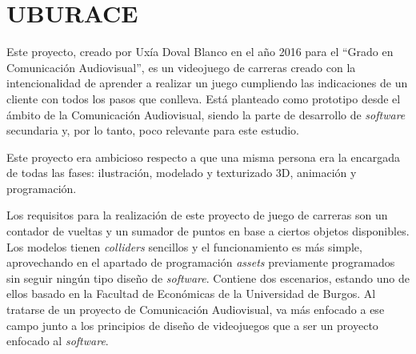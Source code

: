 \section{UBURACE}

Este proyecto, creado por Uxía Doval Blanco en el año 2016 para el ``Grado en Comunicación Audiovisual'', es un videojuego de carreras creado con la intencionalidad de aprender a realizar un juego cumpliendo las indicaciones de un cliente con todos los pasos que conlleva. Está planteado como prototipo desde el ámbito de la Comunicación Audiovisual, siendo la parte de desarrollo de \textit{software} secundaria y, por lo tanto, poco relevante para este estudio. 

Este proyecto era ambicioso respecto a que una misma persona era la encargada de todas las fases: ilustración, modelado y texturizado 3D, animación y programación. 

Los requisitos para la realización de este proyecto de juego de carreras son un contador de vueltas y un sumador de puntos en base a ciertos objetos disponibles. Los modelos tienen \textit{colliders} sencillos y el funcionamiento es más simple, aprovechando en el apartado de programación \textit{assets} previamente programados sin seguir ningún tipo diseño de \textit{software}. Contiene dos escenarios, estando uno de ellos basado en la Facultad de Económicas de la Universidad de Burgos. Al tratarse de un proyecto de Comunicación Audiovisual, va más enfocado a ese campo junto a los principios de diseño de videojuegos que a ser un proyecto enfocado al \textit{software}.

